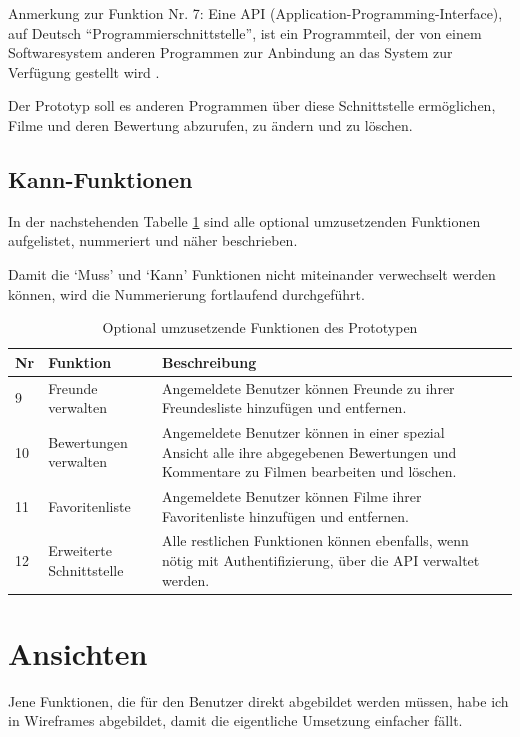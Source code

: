 Anmerkung zur Funktion Nr. 7: Eine API (Application-Programming-Interface), auf 
Deutsch ``Programmierschnittstelle'', ist ein Programmteil, der von einem Softwaresystem 
anderen Programmen zur Anbindung an das System zur Verfügung gestellt wird \cite{api}.

Der Prototyp soll es anderen Programmen über diese Schnittstelle ermöglichen,
Filme und deren Bewertung abzurufen, zu ändern und zu löschen.

\subsection{Kann-Funktionen}
In der nachstehenden Tabelle \ref{tab:kann_funktionen} sind alle optional 
umzusetzenden Funktionen aufgelistet, nummeriert und näher beschrieben.

Damit die `Muss' und `Kann' Funktionen nicht miteinander verwechselt werden 
können, wird die Nummerierung fortlaufend durchgeführt.

\begin{table}[h]
\begin{center}
    \begin{tabular}{llp{8cm}l}
        \toprule Nr & Funktion & Beschreibung \\
        \midrule 9 & Freunde verwalten & Angemeldete Benutzer können Freunde
                     zu ihrer Freundesliste hinzufügen und entfernen. \\
        \midrule 10 & Bewertungen verwalten & Angemeldete Benutzer können
                     in einer spezial Ansicht alle ihre abgegebenen Bewertungen
                     und Kommentare zu Filmen bearbeiten und löschen. \\
        \midrule 11 & Favoritenliste & Angemeldete Benutzer können Filme ihrer
                     Favoritenliste hinzufügen und entfernen. \\
        \midrule 12 & Erweiterte Schnittstelle & Alle restlichen Funktionen
                     können ebenfalls, wenn nötig mit Authentifizierung, über
                     die API verwaltet werden. \\
        \bottomrule
    \end{tabular}
    \caption{Optional umzusetzende Funktionen des Prototypen}
    \label{tab:kann_funktionen}
\end{center}
\end{table}

\section{Ansichten}
Jene Funktionen, die für den Benutzer direkt abgebildet werden müssen, habe
ich in Wireframes \cite{wireframe} abgebildet, damit die eigentliche Umsetzung 
einfacher fällt.

